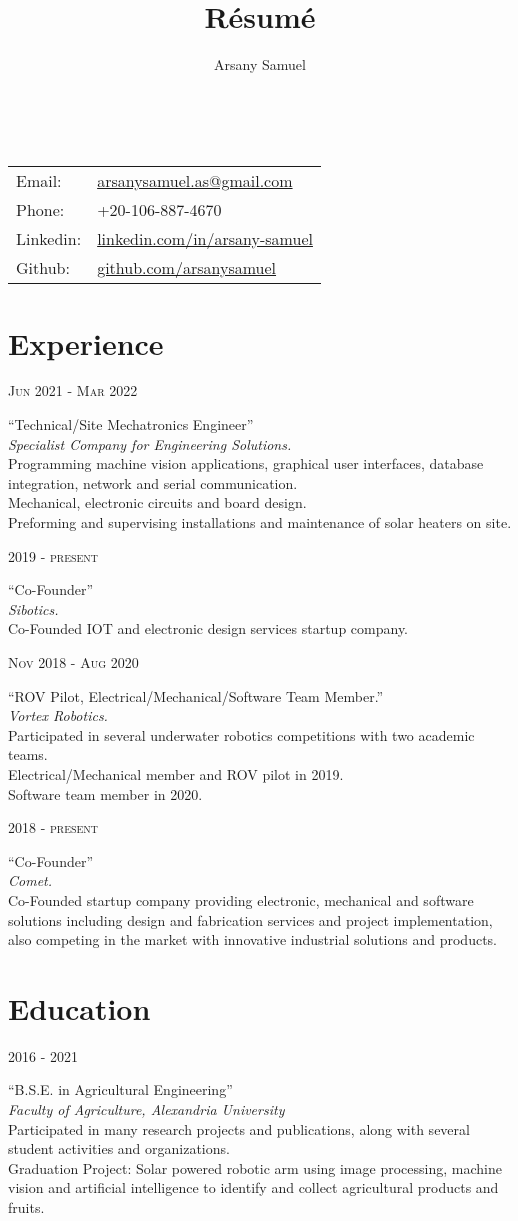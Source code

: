 \documentclass[a4paper]{article}
\title{R\'esum\'e}
\author{Arsany Samuel}
\makeatletter
\renewcommand{\maketitle}{
	\begin{center}
		{\Huge\bfseries{\theauthor}}\\
			\vspace{0.5em}
		{
			\begin{center}
				\large\begin{tabular}{l  l}
					Email: & \href{mailto:arsanysamuel.as@gmail.com}{arsanysamuel.as@gmail.com}  \\ 
					Phone: & +20-106-887-4670  \\
					Linkedin: & \url{linkedin.com/in/arsany-samuel}  \\
					Github: & \url{github.com/arsanysamuel}
				\end{tabular}
			\end{center}
		}
	\end{center}
}
\newcommand{\ag}{Agricultural Engineering}
\newcommand{\foa}{Faculty of Agriculture}
\newcommand{\au}{Alexandria University}
\newcommand{\entry}[4]{   %
	\begin{center}
		\begin{minipage}[c]{0.25\linewidth}  %
			\vfill
			\hfill  %
			\textsc{#1}  %
			\vfill
		\end{minipage}
		\hfill\vline\hfill  %
		\begin{minipage}[c]{0.7\linewidth}
			\textrm{``#2''} \\
			\textit{#3} \\
			\footnotesize{#4}
		\end{minipage}
	\end{center}
}
\makeatother
\begin{document}
	\maketitle
	


	\section{Experience}
		\entry{Jun 2021 - Mar 2022}
			{Technical/Site Mechatronics Engineer}
			{Specialist Company for Engineering Solutions.}
			{Programming machine vision applications, graphical user interfaces, database integration, network and serial communication.\\Mechanical, electronic circuits and board design.\\Preforming and supervising installations and maintenance of solar heaters on site.}
		\entry{2019 - present}
			{Co-Founder}
			{Sibotics.}
			{Co-Founded IOT and electronic design services startup company.}
		\entry{Nov 2018 - Aug 2020}
			{ROV Pilot, Electrical/Mechanical/Software Team Member.}
			{Vortex Robotics.}
			{Participated in several underwater robotics competitions with two academic teams.\\Electrical/Mechanical member and ROV pilot in 2019.\\Software team member in 2020.}
		\entry{2018 - present}  %
			{Co-Founder}
			{Comet.}
			{Co-Founded startup company providing electronic, mechanical and software solutions including design and fabrication services and project implementation, also competing in the market with innovative industrial solutions and products.}

	\section{Education}
		\entry{2016 - 2021}
			{B.S.E. in \ag}
			{\foa, \au }
			{
				Participated in many research projects and publications, along with several student activities and organizations.\\
				Graduation Project: Solar powered robotic arm using image processing, machine vision and artificial intelligence to identify and collect agricultural products and fruits.
			}
\end{document}
